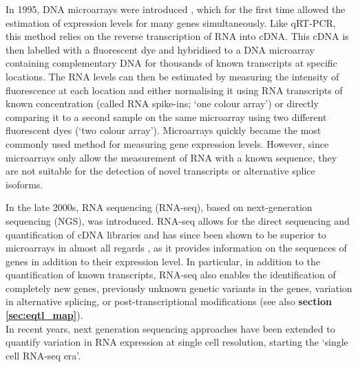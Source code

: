 In 1995, DNA microarrays were introduced \cite{schena1995quantitative}, which for the first time allowed the estimation of expression levels for many genes simultaneously.
Like qRT-PCR, this method relies on the reverse transcription of RNA into cDNA.
This cDNA is then labelled with a fluorescent dye and hybridised to a DNA microarray containing complementary DNA for thousands of known transcripts at specific locations. 
The RNA levels can then be estimated by measuring the intensity of fluorescence at each location and either normalising it using RNA transcripts of known concentration (called RNA spike-ins; `one colour array') or directly comparing it to a second sample on the same microarray using two different fluorescent dyes (`two colour array').
Microarrays quickly became the most commonly used method for measuring gene expression levels. 
However, since microarrays only allow the measurement of RNA with a known sequence, they are not suitable for the detection of novel transcripts or alternative splice isoforms. 

In the late 2000s, RNA sequencing (RNA-seq), based on next-generation sequencing (NGS), 
was introduced.
RNA-seq allows for the direct sequencing and quantification of cDNA libraries \cite{mortazavi2008mapping} and has since been shown to be superior to microarrays in almost all regards 
\cite{marioni2008rna}, as it provides information on the sequences of genes in addition to their expression level.
In particular, in addition to the quantification of known transcripts, RNA-seq also enables the identification of completely new genes, previously unknown genetic variants in the genes, variation in alternative splicing, or post-transcriptional modifications (see also \textbf{section 
\ref{sec:eqtl_map}}).
\\

In recent years, next generation sequencing approaches have been extended to quantify variation in RNA expression at single cell resolution, starting the `single cell RNA-seq era'.


